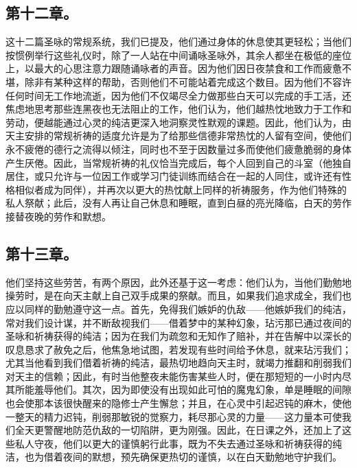 
\subsection{第十二章。}

\par

这十二篇圣咏的常规系统，我们已提及，他们通过身体的休息使其更轻松；当他们按惯例举行这些礼仪时，除了一人站在中间诵咏圣咏外，其余人都坐在极低的座位上，以最大的心思注意力跟随诵咏者的声音。因为他们因日夜禁食和工作而疲惫不堪，除非有某种这样的帮助，否则他们不可能站着完成这个数目。因为他们不容许任何时间无工作地流逝，因为他们不仅竭尽全力做那些白天可以完成的手工活，还焦虑地思考那些连黑夜也无法阻止的工作，他们认为，他们越热忱地致力于工作和劳动，便越能通过心灵的纯洁更深入地洞察灵性默观的课题。因此，他们认为，由天主安排的常规祈祷的适度允许是为了给那些信德非常热忱的人留有空间，使他们永不疲倦的德行之流得以倾注，同时也不至于因数量过多而使他们疲惫脆弱的身体产生厌倦。因此，当常规祈祷的礼仪恰当完成后，每个人回到自己的斗室（他独自居住，或只允许与一位因工作或学习门徒训练而结合在一起的人同住，或许还有性格相似者成为同伴），并再次以更大的热忱献上同样的祈祷服务，作为他们特殊的私人祭献；此后，没有人再让自己休息和睡眠，直到白昼的亮光降临，白天的劳作接替夜晚的劳作和默想。\par


\subsection{第十三章。}

\par

他们坚持这些劳苦，有两个原因，此外还基于这一考虑：他们认为，当他们勤勉地操劳时，是在向天主献上自己双手成果的祭献。而且，如果我们追求成全，我们也应以同样的勤勉遵守这一点。首先，免得我们嫉妒的仇敌——他嫉妒我们的纯洁，常对我们设计谋，并不断敌视我们——借着梦中的某种幻象，玷污那已通过夜间的圣咏和祈祷获得的纯洁；因为在我们为疏忽和无知作了赔补，并在告解中以深长的叹息恳求了赦免之后，他焦急地试图，若发现有些时间给予休息，就来玷污我们；尤其当他看到我们借着祈祷的纯洁，最热切地趋向天主时，就竭力推翻和削弱我们对天主的信赖；因此，有时当他整夜未能伤害某些人时，便在那短短的一小时内尽其所能羞辱他们。其次，因为即使没有出现如此可怕的魔鬼幻象，单是睡眠的间隙也会使那本该很快醒来的隐修士产生懈怠；并且，在心灵中引起迟钝的麻木，使他一整天的精力迟钝，削弱那敏锐的觉察力，耗尽那心灵的力量——这力量本可使我们全天更警醒地防范仇敌的一切陷阱，更为刚强。因此，在日课之外，还加上了这些私人守夜，他们以更大的谨慎躬行此事，既为不失去通过圣咏和祈祷获得的纯洁，也为借着夜间的默想，预先确保更热切的谨慎，以在白天勤勉地守护我们。\par

